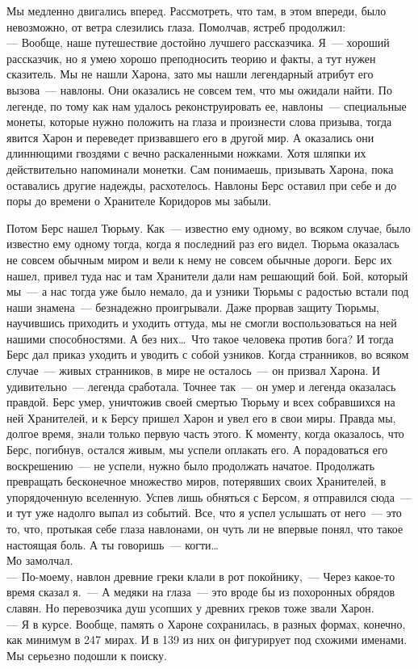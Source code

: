 Мы медленно двигались вперед. Рассмотреть, что там, в этом впереди, было 
невозможно, от ветра слезились глаза. Помолчав, ястреб продолжил:\\
--- Вообще, наше путешествие достойно лучшего рассказчика. Я~--- хороший 
рассказчик, но я умею хорошо преподносить теорию и факты, а тут нужен сказитель. Мы не 
нашли Харона, зато мы нашли легендарный атрибут его вызова~--- навлоны. Они оказались 
не совсем тем, что мы ожидали найти. По легенде, по тому как нам удалось 
реконструировать ее, навлоны~--- специальные монеты, которые нужно положить на 
глаза и произнести слова призыва, тогда явится Харон и переведет призвавшего 
его в другой мир. А оказались они длиннющими гвоздями с вечно раскаленными ножками. 
Хотя шляпки их действительно напоминали монетки. Сам понимаешь, призывать 
Харона, пока оставались другие надежды, расхотелось. Навлоны Берс оставил при 
себе и до поры до времени о Хранителе Коридоров мы забыли.

Потом Берс нашел Тюрьму. Как~--- известно ему одному, во всяком случае, было 
известно ему одному тогда, когда я последний раз его видел. Тюрьма оказалась не 
совсем обычным миром и вели к нему не совсем обычные дороги. Берс их нашел, 
привел туда нас и там Хранители дали нам решающий бой. Бой, который мы~--- а 
нас тогда уже было немало, да и узники Тюрьмы с радостью встали под наши 
знамена~--- безнадежно проигрывали. Даже прорвав защиту Тюрьмы, научившись приходить и 
уходить оттуда, мы не смогли воспользоваться на ней нашими способностями. А без 
них\ldots\ Что такое человека против бога? И тогда Берс дал приказ уходить и 
уводить с собой узников. Когда странников, во всяком случае~--- живых странников, в мире 
не осталось~--- он призвал Харона. И удивительно~--- легенда сработала. Точнее 
так~--- он умер и легенда оказалась правдой. Берс умер, уничтожив своей смертью Тюрьму и 
всех собравшихся на ней Хранителей, и к Берсу пришел Харон и увел его в свои 
миры. Правда мы, долгое время, знали только первую часть этого. К моменту, 
когда оказалось, что Берс, погибнув, остался живым, мы успели оплакать его. А 
порадоваться его воскрешению~--- не успели, нужно было продолжать начатое. 
Продолжать превращать бесконечное множество миров, потерявших своих Хранителей, 
в упорядоченную вселенную. Успев лишь обняться с Берсом, я отправился сюда~--- 
и тут уже надолго выпал из событий. Все, что я успел услышать от него~--- это то, 
что, протыкая себе глаза навлонами, он чуть ли не впервые понял, что такое 
настоящая боль. А ты говоришь~--- когти\ldots\\
Мо замолчал.\\
--- По-моему, навлон древние греки клали в рот покойнику,~--- Через какое-то 
время сказал я.~--- А медяки на глаза~--- это вроде бы из похоронных обрядов славян. 
Но перевозчика душ усопших у древних греков тоже звали Харон.\\
--- Я в курсе. Вообще, память о Хароне сохранилась, в разных формах, конечно, как 
минимум в 247 мирах. И в 139 из них он фигурирует под схожими именами. Мы 
серьезно подошли к поиску.

